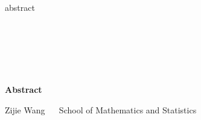 \newcommand{\enabstractname}{Abstract}
\newcommand{\cnabstractname}{摘$\quad$要}

\newenvironment{cnabstract}{%
    \if@twocolumn
        \section*{\cnabstractname}%
    \else
        \small
        \chapter*{~~~}
        \vspace{-150pt}
        \addcontentsline{toc}{chapter}{\texorpdfstring{摘$\quad$要}{摘要}}
        \begin{center}%
            \vskip 4.5cm
            \heiti\sanhao\textbf{$\qquad$标题$\qquad$}\\
            \vskip 20pt
            \phantomsection
            \setlength{\baselineskip}{16pt}
        \end{center}%
        \begin{center}
            王子颉 $\quad$ 数学与统计学院
        \end{center}
        \vspace{-15pt}
    \fi}


\newenvironment{abstract}{%
    \if@twocolumn
        \section*{\abstractname}%
    \else
        \small
        \chapter*{~~}
        \vspace{-150pt}
        \begin{center}%
            \setlength{\baselineskip}{20pt}
            \vskip 4.5cm
                {\bfseries{}}\\
            \vskip 20pt
            \setlength{\baselineskip}{16pt}
            {\bfseries\sihao \enabstractname}
        \end{center}
        \begin{center}
            Zijie Wang $\quad$ School of Mathematics and Statistics
        \end{center}
        \vspace{-15pt}
        \xiaosihao\quotation
    \fi}

